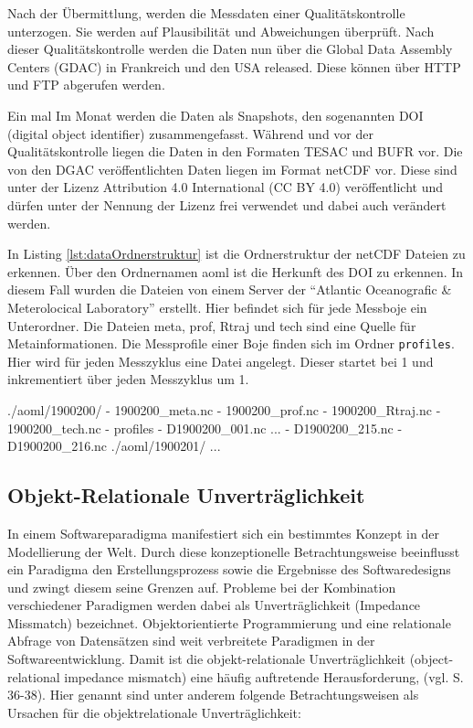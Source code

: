     Nach der Übermittlung, werden die Messdaten einer Qualitätskontrolle unterzogen. Sie werden auf Plausibilität und Abweichungen überprüft. Nach dieser Qualitätskontrolle werden die Daten nun über die Global Data Assembly Centers (GDAC) in Frankreich und den USA released. Diese können über HTTP und FTP abgerufen werden. 
    
    Ein mal Im Monat werden die Daten als Snapshots, den sogenannten DOI (digital object identifier) zusammengefasst. 
    Während und vor der Qualitätskontrolle liegen die Daten in den Formaten TESAC und BUFR vor. 
    Die von den DGAC veröffentlichten Daten liegen im Format netCDF vor. Diese sind unter der Lizenz Attribution 4.0 International (CC BY 4.0) veröffentlicht und dürfen unter der Nennung der Lizenz frei verwendet und dabei auch verändert werden.
    
    \cite{ArgoDataDocumentation}
    

In Listing \ref{lst:dataOrdnerstruktur} ist die Ordnerstruktur der netCDF Dateien zu erkennen. Über den Ordnernamen aoml ist die Herkunft des DOI zu erkennen. In diesem Fall wurden die Dateien von einem Server der  "`Atlantic Oceanografic \& Meterolocical Laboratory"' erstellt. Hier befindet sich für jede Messboje ein Unterordner.  Die Dateien meta, prof, Rtraj und tech sind eine Quelle für Metainformationen. Die Messprofile einer Boje finden sich im Ordner \texttt{profiles}. Hier wird für jeden Messzyklus eine Datei angelegt. Dieser startet bei 1 und inkrementiert über jeden Messzyklus um 1.
    
    \begin{python}[label={lst:dataOrdnerstruktur}, caption={Die Verzeichnisstruktur der vom aoml bereitgestellten Daten}]
./aoml/1900200/
- 1900200_meta.nc
- 1900200_prof.nc
- 1900200_Rtraj.nc
- 1900200_tech.nc
- profiles
    - D1900200_001.nc
    ...
    - D1900200_215.nc
    - D1900200_216.nc
./aoml/1900201/
...\end{python}


\subsection{Objekt-Relationale Unverträglichkeit}

In einem Softwareparadigma manifestiert sich ein bestimmtes Konzept in der Modellierung der Welt. Durch diese konzeptionelle Betrachtungsweise beeinflusst ein Paradigma den Erstellungsprozess sowie die Ergebnisse des Softwaredesigns und zwingt diesem seine Grenzen auf. Probleme bei der Kombination verschiedener Paradigmen werden dabei als Unverträglichkeit (Impedance Missmatch) bezeichnet.
Objektorientierte Programmierung  und eine relationale Abfrage von Datensätzen sind weit verbreitete Paradigmen in der Softwareentwicklung. Damit ist die objekt-relationale Unverträglichkeit (object-relational impedance mismatch) eine häufig auftretende Herausforderung, (vgl. \cite{ireland2009classification} S. 36-38).
Hier genannt sind unter anderem folgende Betrachtungsweisen als Ursachen für die objektrelationale Unverträglichkeit:

